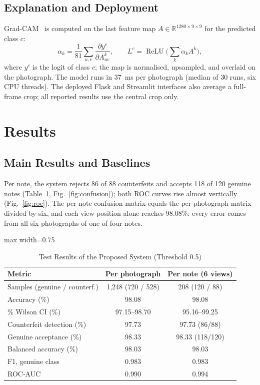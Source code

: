 \documentclass[journal,onecolumn]{IEEEtran}
\begin{document}
\subsection{Explanation and Deployment}
Grad-CAM~\cite{selvaraju2017gradcam} is computed on the last feature map
$A\in\mathbb{R}^{1280\times9\times9}$ for the predicted class $c$:
\begin{equation}
\alpha_k = \frac{1}{81}\sum_{u,v}\frac{\partial y^{c}}{\partial A^{k}_{uv}},\qquad
L^{c} = \operatorname{ReLU}\!\Big(\sum_{k}\alpha_k A^{k}\Big),
\label{eq:gradcam}
\end{equation}
where $y^c$ is the logit of class $c$; the map is normalised, upsampled, and overlaid on
the photograph. The model runs in 37~ms per photograph (median of 30 runs, six CPU threads). The
deployed Flask and Streamlit interfaces also average a full-frame crop; all reported
results use the central crop only.

\section{Results}
\label{sec:results}

\subsection{Main Results and Baselines}
Per note, the system rejects 86 of 88 counterfeits and accepts 118 of 120 genuine notes
(Table~\ref{tab:main}, Fig.~\ref{fig:confusion}); both ROC curves rise almost vertically
(Fig.~\ref{fig:roc}). The per-note confusion matrix equals the per-photograph matrix
divided by six, and each view position alone reaches 98.08\%: every error comes from all
six photographs of one of four notes.

\begin{table}[!htbp]
\caption{Test Results of the Proposed System (Threshold 0.5)}
\label{tab:main}
\centering
\footnotesize
\setlength{\tabcolsep}{4pt}
\begin{adjustbox}{max width=0.75\linewidth}
\begin{tabular}{@{}lcc@{}}
\toprule
Metric & Per photograph & Per note (6 views) \\
\midrule
Samples (genuine / counterf.) & 1{,}248 (720 / 528) & 208 (120 / 88) \\
Accuracy (\%) & 98.08 & 98.08 \\
\quad 95\% Wilson CI (\%) & 97.15--98.70 & 95.16--99.25 \\
Counterfeit detection (\%) & 97.73 & 97.73 (86/88) \\
Genuine acceptance (\%) & 98.33 & 98.33 (118/120) \\
Balanced accuracy (\%) & 98.03 & 98.03 \\
F1, genuine class & 0.983 & 0.983 \\
ROC-AUC & 0.990 & 0.994 \\
\bottomrule
\end{tabular}
\end{adjustbox}
\end{table}
\end{document}
